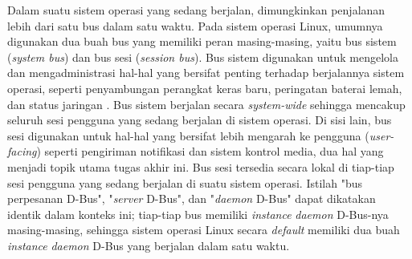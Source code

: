 Dalam suatu sistem operasi yang sedang berjalan, dimungkinkan penjalanan lebih dari satu bus dalam satu waktu. Pada sistem operasi Linux, umumnya digunakan dua buah bus yang memiliki peran masing-masing, yaitu bus sistem (\textit{system bus}) dan bus sesi (\textit{session bus}). Bus sistem digunakan untuk mengelola dan mengadministrasi hal-hal yang bersifat penting terhadap berjalannya sistem operasi, seperti penyambungan perangkat keras baru, peringatan baterai lemah, dan status jaringan \cite{will2020trusted}. Bus sistem berjalan secara \textit{system-wide} sehingga mencakup seluruh sesi pengguna yang sedang berjalan di sistem operasi. Di sisi lain, bus sesi digunakan untuk hal-hal yang bersifat lebih mengarah ke pengguna (\textit{user-facing}) seperti pengiriman notifikasi dan sistem kontrol media, dua hal yang menjadi topik utama tugas akhir ini. Bus sesi tersedia secara lokal di tiap-tiap sesi pengguna yang sedang berjalan di suatu sistem operasi. Istilah "bus perpesanan D-Bus", "\textit{server} D-Bus", dan "\textit{daemon} D-Bus" dapat dikatakan identik dalam konteks ini; tiap-tiap bus memiliki \textit{instance} \textit{daemon} D-Bus-nya masing-masing, sehingga sistem operasi Linux secara \textit{default} memiliki dua buah \textit{instance} \textit{daemon} D-Bus yang berjalan dalam satu waktu.

